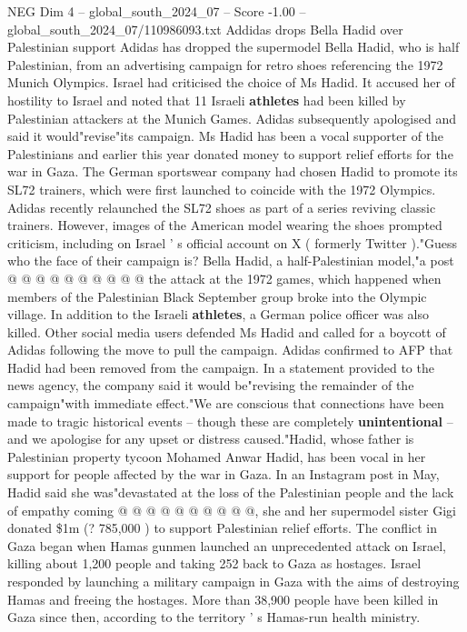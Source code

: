 \begin{textsample}{NEG Dim 4 – global\_south\_2024\_07 – Score -1.00 – global\_south\_2024\_07/110986093.txt}  \label{ex:f4_neg_343}
Addidas drops Bella Hadid over Palestinian support Adidas has dropped the supermodel Bella Hadid, who is half Palestinian, from an advertising campaign for retro shoes referencing the 1972 Munich Olympics.
Israel had criticised the choice of Ms Hadid.
It accused her of hostility to Israel and noted that 11 Israeli \textbf{athletes} had been killed by Palestinian attackers at the Munich Games.
Adidas subsequently apologised and said it would"revise"its campaign.
Ms Hadid has been a vocal supporter of the Palestinians and earlier this year donated money to support relief efforts for the war in Gaza.
The German sportswear company had chosen Hadid to promote its SL72 trainers, which were first launched to coincide with the 1972 Olympics.
Adidas recently relaunched the SL72 shoes as part of a series reviving classic trainers.
However, images of the American model wearing the shoes prompted criticism, including on Israel ' s official account on X ( formerly Twitter )."Guess who the face of their campaign is?
Bella Hadid, a half-Palestinian model,"a post @ @ @ @ @ @ @ @ @ @ the attack at the 1972 games, which happened when members of the Palestinian Black September group broke into the Olympic village.
In addition to the Israeli \textbf{athletes}, a German police officer was also killed.
Other social media users defended Ms Hadid and called for a boycott of Adidas following the move to pull the campaign.
Adidas confirmed to AFP that Hadid had been removed from the campaign.
In a statement provided to the news agency, the company said it would be"revising the remainder of the campaign"with immediate effect."We are conscious that connections have been made to tragic historical events -- though these are completely \textbf{unintentional} -- and we apologise for any upset or distress caused."Hadid, whose father is Palestinian property tycoon Mohamed Anwar Hadid, has been vocal in her support for people affected by the war in Gaza.
In an Instagram post in May, Hadid said she was"devastated at the loss of the Palestinian people and the lack of empathy coming @ @ @ @ @ @ @ @ @ @, she and her supermodel sister Gigi donated \$1m (? 785,000 ) to support Palestinian relief efforts.
The conflict in Gaza began when Hamas gunmen launched an unprecedented attack on Israel, killing about 1,200 people and taking 252 back to Gaza as hostages.
Israel responded by launching a military campaign in Gaza with the aims of destroying Hamas and freeing the hostages.
More than 38,900 people have been killed in Gaza since then, according to the territory ' s Hamas-run health ministry.

\end{textsample}
